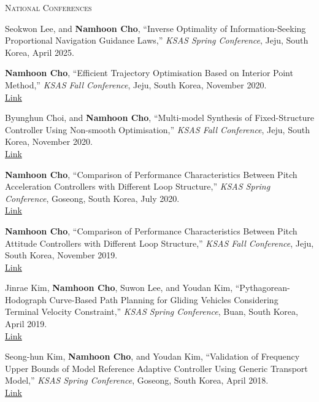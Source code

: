 \textsc{National Conferences}
\vspace{0.5em}
\begin{enumerate}[itemsep=0.5em, label={[}NC\arabic*{]}]
\item Seokwon Lee, and \textbf{Namhoon Cho}, ``Inverse Optimality of Information-Seeking Proportional Navigation Guidance Laws,'' \textit{KSAS Spring Conference}, Jeju, South Korea, April 2025. 

\item \textbf{Namhoon Cho}, ``Efficient Trajectory Optimisation Based on Interior Point Method,'' \textit{KSAS Fall Conference}, Jeju, South Korea, November 2020. \\
\href{https://www.dbpia.co.kr/journal/articleDetail?nodeId=NODE10526421}{Link}

\item Byunghun Choi, and \textbf{Namhoon Cho}, ``Multi-model Synthesis of Fixed-Structure Controller Using Non-smooth Optimisation,'' \textit{KSAS Fall Conference}, Jeju, South Korea, November 2020. \\
\href{https://www.dbpia.co.kr/journal/articleDetail?nodeId=NODE10526423}{Link}

\item \textbf{Namhoon Cho}, ``Comparison of Performance Characteristics Between Pitch Acceleration Controllers with Different Loop Structure,'' \textit{KSAS Spring Conference}, Goseong, South Korea, July 2020. \\
\href{https://www.dbpia.co.kr/journal/articleDetail?nodeId=NODE10442338}{Link}

\item \textbf{Namhoon Cho}, ``Comparison of Performance Characteristics Between Pitch Attitude Controllers with Different Loop Structure,'' \textit{KSAS Fall Conference}, Jeju, South Korea, November 2019. \\
\href{https://www.dbpia.co.kr/journal/articleDetail?nodeId=NODE09318235}{Link}

\item Jinrae Kim, \textbf{Namhoon Cho}, Suwon Lee, and Youdan Kim, ``Pythagorean-Hodograph Curve-Based Path Planning for Gliding Vehicles Considering Terminal Velocity Constraint,'' \textit{KSAS Spring Conference}, Buan, South Korea, April 2019. \\
\href{https://www.dbpia.co.kr/journal/articleDetail?nodeId=NODE08753036}{Link}

\item Seong-hun Kim, \textbf{Namhoon Cho}, and Youdan Kim, ``Validation of Frequency Upper Bounds of Model Reference Adaptive Controller Using Generic Transport Model,'' \textit{KSAS Spring Conference}, Goseong, South Korea, April 2018. \\
\href{https://www.dbpia.co.kr/journal/articleDetail?nodeId=NODE07525696}{Link}


\end{enumerate}
